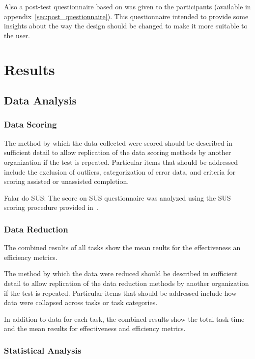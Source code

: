 \documentclass[a4paper]{article}
\begin{document}
 Also a post-test questionnaire based on  was given to the participants (available in appendix~\ref{sec:post_questionnaire}). This questionnaire intended to provide some insights about the way the design should be changed to make it more suitable to the user.
 
 
 \section{Results}
 \subsection{Data Analysis}
 \subsubsection{Data Scoring}
 The method by which the data collected were scored should be described in sufficient detail to allow replication of the data scoring methods by another organization if the test is repeated. Particular items that should be addressed include the exclusion of outliers, categorization of error data, and criteria for scoring assisted or unassisted completion.
 
 Falar do SUS:
 The score on SUS questionnaire was analyzed using the SUS scoring procedure provided in~\citep{brooke1996sus}.
 
\subsubsection{Data Reduction}

  The combined results of all tasks show the mean reults for the effectiveness an efficiency metrics.
  
  The method by which the data were reduced should be described in sufficient detail to allow replication of the data reduction methods by another organization if the test is repeated. Particular items that should be addressed include how data were collapsed across tasks or task categories.
  
  In addition to data for each task, the combined results show the total task time and the mean results for effectiveness and efficiency metrics.
  
\subsubsection{Statistical Analysis}
   
\end{document}
